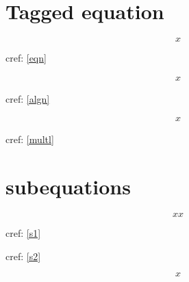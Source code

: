 \documentclass{amsart}
\begin{document}
\section{Tagged equation}

\begin{equation}
    x\label{eqn}\tag{tag}
\end{equation}

cref: \cref{eqn}

\begin{align}
    x\label{algn}\tag{algn tag}
\end{align}

cref: \cref{algn}

\begin{multline}
    x\label{multl}\tag{multl tag}
\end{multline}

cref: \cref{multl}

\section{subequations}

\begin{subequations}
\begin{equation}
    x\label{s1}\tag{s1}
\end{equation}
\begin{equation}
    x\label{s2}\tag{s2}
\end{equation}
\end{subequations}

cref: \cref{s1}

cref: \cref{s2}


\begin{equation}
x
\end{equation}
\end{document}

